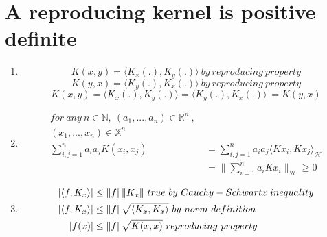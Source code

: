 \documentclass{article}
\begin{document}
\section{A reproducing kernel is positive definite}
\begin{enumerate}
    \item 
        \[K(x,y) = \langle K_x(.), K_y(.) \rangle\ by\ reproducing\ property\]
        \[K(y,x) = \langle K_y(.), K_x(.) \rangle\ by\ reproducing\ property\] 
        \[K(x,y) = \langle K_x(.), K_y(.) \rangle = \langle K_y(.), K_x(.) \rangle\ =  K(y,x)\]
    \item
        \begin{equation}
        \begin{aligned}
        for\ any\ n \in \mathbb{N},\ (a_1, ..., a_n) \in \mathbb{R}^n\ ,\ \\
        (x_1, ..., x_n) \in \mathbb{X}^n \\
        \sum_{i,j=1}^{n} a_i a_j K(x_i, x_j) &= \sum_{i,j=1}^{n} a_i a_j \langle Kx_i, Kx_j\rangle_{\mathcal{H}} \\
        & = \bigg \| \sum_{i=1}^{n} a_i Kx_i \bigg \|_{\mathcal{H}} \ge 0
        \end{aligned}
        \end{equation}
    \item 
        \begin{equation}
        \begin{aligned}
        |\langle f, K_x \rangle|& \le  \|f\| \| K_x \|\ true\ by\ Cauchy-Schwartz\ inequality \notag \\
        |\langle f, K_x \rangle|& \le  \|f\| \sqrt{\langle K_x, K_x \rangle} \ by\ norm\ definition\notag \\
        |f(x)| & \le \|f\|\sqrt{K(x,x)}\ reproducing\ property
        \end{aligned}
        \end{equation}
\end{enumerate}
\end{document}
